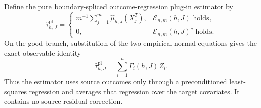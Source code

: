 Define the pure boundary-spliced outcome-regression plug-in estimator by
\[
\widehat\tau^{\mathrm{pl}}_{h,J}=
\begin{cases}
m^{-1}\sum_{j=1}^m\widehat\mu_{h,J}(X_j^T),&\mathcal E_{n,m}(h,J)\text{ holds},\\
0,&\mathcal E_{n,m}(h,J)^c\text{ holds}.
\end{cases}
\]
On the good branch, substitution of the two empirical normal equations gives the exact observable identity
\[
\widehat\tau^{\mathrm{pl}}_{h,J}=\sum_{i=1}^n\Gamma_i(h,J)Z_i.
\]
Thus the estimator uses source outcomes only through a preconditioned least-squares regression and averages that regression over the target covariates.  It contains no source residual correction.